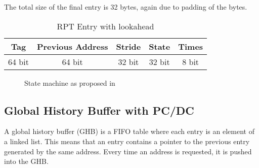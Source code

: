The total size of the final entry is 32 bytes, again due to padding of
the bytes.

\begin{table}[h]
  \centering
  \begin{tabular}{| c | c | c | c | c |}
    \hline
    Tag & Previous Address & Stride & State & Times \\ \hline
    64 bit & 64 bit & 32 bit & 32 bit & 8 bit \\ \hline
  \end{tabular}
  \caption{RPT Entry with lookahead}
  \label{table:entry_la}
\end{table}

\begin{figure}[h!]
\begin{center}
\caption{State machine as proposed in~\cite{chen_baer_1995}}
\label{figure:statemachine}
\end{center}
\end{figure}

\subsection{Global History Buffer with PC/DC}

A global history buffer (GHB) is a FIFO table where each entry is an
element of a linked list. This means that an entry contains a pointer
to the previous entry generated by the same address. Every time an
address is requested, it is pushed into the GHB.

